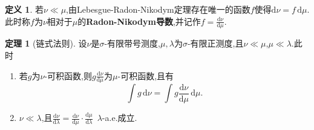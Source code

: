 \documentclass{ctexart}
\theoremstyle{definition}
\newtheorem{definition}{定义}
\newtheorem{theorem}{定理}
\theoremstyle{remark}
\begin{document}
	\begin{definition}
		若$\nu\ll\mu$,由Lebesgue-Radon-Nikodym定理存在唯一的函数$f$使得$\mathrm{d}\nu=f\,\mathrm{d}\mu$.此时称$f$为$\nu$相对于$\mu$的\textbf{Radon-Nikodym导数},并记作$f=\frac{\mathrm{d}\nu}{\mathrm{d}\mu}$.
	\end{definition}
	\begin{theorem}[链式法则]
		设$\nu$是$\sigma$-有限带号测度,$\mu,\lambda$为$\sigma$-有限正测度,且$\nu\ll\mu$,$\mu\ll\lambda$.此时
		
		\begin{enumerate}
			\item 若$g$为$\nu$-可积函数,则$g\frac{\mathrm{d}\nu}{\mathrm{d}\mu}$为$\mu$-可积函数,且有
			$$\int{g\,\mathrm{d}\nu}=\int{g\frac{\mathrm{d}\nu}{\mathrm{d}\mu}\,\mathrm{d}\mu}.$$
			
			\item $\nu\ll\lambda$,且$\frac{\mathrm{d}\nu}{\mathrm{d}\lambda}=\frac{\mathrm{d}\nu}{\mathrm{d}\mu}\cdot\frac{\mathrm{d}\mu}{\mathrm{d}\lambda}$\ $\lambda$-a.e.成立.
		\end{enumerate}
	\end{theorem}
	
\end{document}
